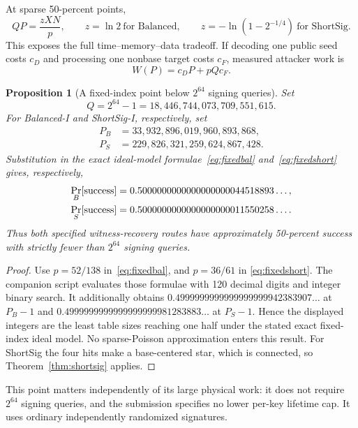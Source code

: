 \documentclass[11pt,a4paper]{article}
\newtheorem{proposition}[theorem]{Proposition}
\newcommand{\Prb}{\mathop{\rm Pr}}
\begin{document}
At sparse 50-percent points,
\begin{equation}
 QP=\frac{zXN}{p},\qquad
 z=\ln2\ \text{for Balanced},\qquad
 z=-\ln(1-2^{-1/4})\ \text{for ShortSig}.              \label{eq:pareto}
\end{equation}
This exposes the full time--memory--data tradeoff.  If decoding one public seed
costs $c_D$ and processing one nonbase target costs $c_F$, measured attacker
work is
\begin{equation}
                  W(P)=c_DP+pQc_F.                     \label{eq:weighted}
\end{equation}

\begin{proposition}[A fixed-index point below $2^{64}$ signing queries]
\label{prop:q64}
Set
\[
 Q=2^{64}-1=18,446,744,073,709,551,615.
\]
For Balanced-I and ShortSig-I, respectively, set
\begin{align*}
 P_B&=33,932,896,019,960,893,868,\\
 P_S&=229,826,321,259,624,867,428.
\end{align*}
Substitution in the exact ideal-model
formulae~\eqref{eq:fixedbal} and~\eqref{eq:fixedshort} gives, respectively,
\begin{align*}
 \Prb_B[\mathrm{success}]&=
  0.5000000000000000000044518893\ldots,\\
 \Prb_S[\mathrm{success}]&=
  0.5000000000000000000011550258\ldots.
\end{align*}
Thus both specified witness-recovery routes have approximately 50-percent
success with strictly fewer than $2^{64}$ signing queries.
\end{proposition}
\begin{proof}
Use $p=52/138$ in~\eqref{eq:fixedbal}, and $p=36/61$ in
\eqref{eq:fixedshort}.  The companion script evaluates those formulae with
120 decimal digits and integer binary search.  It additionally obtains
$0.4999999999999999999942383907\ldots$ at $P_B-1$ and
$0.4999999999999999999981283883\ldots$ at $P_S-1$.  Hence the displayed
integers are the least table sizes reaching one half under the stated exact
fixed-index ideal model.  No sparse-Poisson approximation enters this result.
For ShortSig the four hits make a base-centered star, which is connected, so
Theorem~\ref{thm:shortsig} applies.
\end{proof}

This point matters independently of its large physical work: it does not
require $2^{64}$ signing queries, and the submission specifies no lower
per-key lifetime cap.  It uses ordinary independently randomized signatures.
\end{document}
